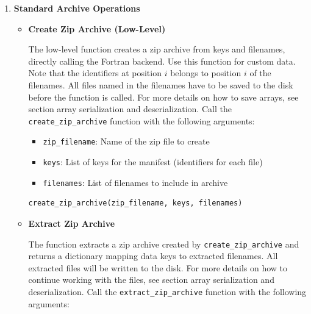 \documentclass[11pt]{article}
\begin{document}
\begin{enumerate}
	\item \textbf{Standard Archive Operations}
	      \begin{itemize}
	      	\item \textbf{Create Zip Archive (Low-Level)}
	      	      
	      	      The low-level function creates a zip archive from keys and filenames,
	      	      directly calling the Fortran backend. Use this function for custom data.
	      	      Note that the identifiers at position $i$ belongs to position $i$ of
	      	      the filenames. All files named in the filenames have to be saved to the
	      	      disk before the function is called. For more details on how to save
	      	      arrays, see section array serialization and deserialization. Call the
	      	      \texttt{create\_zip\_archive} function with the following arguments:
	      	      
	      	      \begin{itemize}
	      	      	\item \texttt{zip\_filename}: Name of the zip file to create
	      	      	      
	      	      	\item \texttt{keys}: List of keys for the manifest (identifiers for
	      	      	      each file)
	      	      	      
	      	      	\item \texttt{filenames}: List of filenames to include in archive
	      	      \end{itemize}
	      	      
	      	      \begin{lstlisting}[language=Python, caption={Python Create Zip Archive (Low-Level)}]
create_zip_archive(zip_filename, keys, filenames)
	      	      \end{lstlisting}
	      	      
	      	\item \textbf{Extract Zip Archive}
	      	      
	      	      The function extracts a zip archive created by \texttt{create\_zip\_archive}
	      	      and returns a dictionary mapping data keys to extracted filenames. All
	      	      extracted files will be written to the disk. For more details on how
	      	      to continue working with the files, see section array serialization and
	      	      deserialization. Call the \texttt{extract\_zip\_archive} function with
	      	      the following arguments:
	      	      

\end{itemize}
\end{enumerate}
\end{document}
